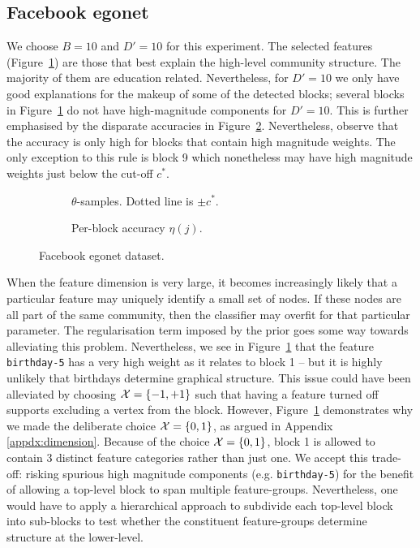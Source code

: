 \subsection{Facebook egonet}

We choose $B=10$ and $D'=10$ for this experiment. The selected features 
(Figure~\ref{fig:fb-null}) are those that best explain the high-level 
community structure. The majority of them are education related. 
Nevertheless, for $D'=10$ we only have good explanations for the makeup 
of some of the detected blocks; several blocks in 
Figure~\ref{fig:fb-null} do not have high-magnitude components for $D'=10$. This is further emphasised by the disparate accuracies in Figure~\ref{fig:fb-accuracy}. Nevertheless, observe that the accuracy is only high for blocks that contain high magnitude weights. The only exception to this rule is block 9 which nonetheless may have high magnitude weights just below the cut-off $c^*$.
%
\begin{figure}[!h]
	\centering
	\begin{subfigure}[t]{0.45\linewidth}
		\centering
		\caption{$\theta$-samples. Dotted line is $\pm c^*$.}
		\label{fig:fb-null}
	\end{subfigure}
	\begin{subfigure}[t]{0.45\linewidth}
		\centering
		\caption{Per-block accuracy $\eta(j)$.}
		\label{fig:fb-accuracy}
	\end{subfigure}
	\caption{Facebook egonet dataset.}
	\label{fig:fb}
\end{figure}

When the feature dimension is very large, it becomes increasingly likely that 
a particular feature may uniquely identify a small set of nodes. If these nodes 
are all part of the same community, then the classifier may overfit for that 
particular parameter. The regularisation term imposed by the prior goes some 
way towards alleviating this problem. Nevertheless, we see in 
Figure~\ref{fig:fb-null} that the feature \verb*|birthday-5| has a very 
high weight as it relates to block 1 -- but it is highly unlikely
that birthdays determine graphical structure. This issue could have been alleviated by 
choosing $\mathcal{X}=\{-1, +1\}$ such that having a feature turned off supports excluding 
a vertex from the block. However, Figure~\ref{fig:fb-null} demonstrates why we made 
the deliberate choice $\mathcal{X}=\{0,1\}$, as argued in Appendix \ref{appdx:dimension}. 
Because of the choice $\mathcal{X}=\{0,1\}$, block 1 is allowed to contain 3 distinct feature 
categories rather than just one. We accept this trade-off: risking spurious high magnitude 
components (e.g. \verb*|birthday-5|) for the benefit of allowing a top-level block to span 
multiple feature-groups. Nevertheless, one would have to apply a hierarchical approach 
to subdivide each top-level block into sub-blocks to test whether the constituent 
feature-groups determine structure at the lower-level.

